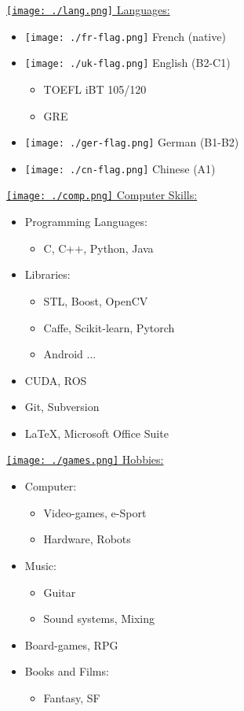 \documentclass[a4paper]{article}
\begin{document}
\begin{minipage}[t]{.3\textwidth}
	\underline{
		\texttt{[image: ./lang.png]}
		Languages:
	}
	\begin{itemize}
		\item[] \texttt{[image: ./fr-flag.png]} French (native)
		\item[] \texttt{[image: ./uk-flag.png]} English (B2-C1)
			\begin{itemize}
				\item TOEFL iBT 105/120
				\item GRE
			\end{itemize}
		\item[] \texttt{[image: ./ger-flag.png]} German (B1-B2)
		\item[] \texttt{[image: ./cn-flag.png]} Chinese (A1)
	\end{itemize}
\end{minipage}
\hfill
\begin{minipage}[t]{.3\textwidth}
	\underline{
		\texttt{[image: ./comp.png]}
		Computer Skills:
	}
	\begin{itemize}
		\item Programming Languages:
			\begin{itemize}
				\item C, C++, Python, Java
			\end{itemize}
		\item Libraries:
			\begin{itemize}
				\item STL, Boost, OpenCV
				\item Caffe, Scikit-learn, Pytorch
				\item Android ...
			\end{itemize}
		\item CUDA, ROS
		\item Git, Subversion
		\item LaTeX, Microsoft Office Suite
	\end{itemize}
\end{minipage}
\hfill
\begin{minipage}[t]{.3\textwidth}
	\underline{
		\texttt{[image: ./games.png]}
		Hobbies:
	}
	\begin{itemize}
		\item Computer:
			\begin{itemize}
				\item Video-games, e-Sport
				\item Hardware, Robots
			\end{itemize}
		\item Music:
			\begin{itemize}
				\item Guitar
				\item Sound systems, Mixing
			\end{itemize}
		\item Board-games, RPG
		\item Books and Films:
			\begin{itemize}
				\item Fantasy, SF
			\end{itemize}
	\end{itemize}
\end{minipage}
\end{document}
